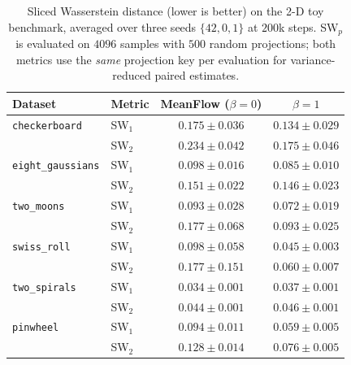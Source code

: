 \begin{table}[!t]
    \centering
    \caption{Sliced Wasserstein distance (lower is better) on the 2-D toy benchmark, averaged over three seeds $\{42,0,1\}$ at $200$k steps. SW$_p$ is evaluated on $4096$ samples with $500$ random projections; both metrics use the \emph{same} projection key per evaluation for variance-reduced paired estimates.}
    \label{tab: toy}
    \begin{tabular}{llcc}
        \toprule
        Dataset & Metric & MeanFlow ($\beta\!=\!0$) & $\beta\!=\!1$ \\
        \midrule
        \texttt{checkerboard}    & SW$_1$ & $0.175 \pm 0.036$ & $\mathbf{0.134 \pm 0.029}$ \\
                                 & SW$_2$ & $0.234 \pm 0.042$ & $\mathbf{0.175 \pm 0.046}$ \\
        \midrule
        \texttt{eight\_gaussians}& SW$_1$ & $0.098 \pm 0.016$ & $\mathbf{0.085 \pm 0.010}$ \\
                                 & SW$_2$ & $0.151 \pm 0.022$ & $\mathbf{0.146 \pm 0.023}$ \\
        \midrule
        \texttt{two\_moons}      & SW$_1$ & $0.093 \pm 0.028$ & $\mathbf{0.072 \pm 0.019}$ \\
                                 & SW$_2$ & $0.177 \pm 0.068$ & $\mathbf{0.093 \pm 0.025}$ \\
        \midrule
        \texttt{swiss\_roll}     & SW$_1$ & $0.098 \pm 0.058$ & $\mathbf{0.045 \pm 0.003}$ \\
                                 & SW$_2$ & $0.177 \pm 0.151$ & $\mathbf{0.060 \pm 0.007}$ \\
        \midrule
        \texttt{two\_spirals}    & SW$_1$ & $\mathbf{0.034 \pm 0.001}$ & $0.037 \pm 0.001$ \\
                                 & SW$_2$ & $\mathbf{0.044 \pm 0.001}$ & $0.046 \pm 0.001$ \\
        \midrule
        \texttt{pinwheel}        & SW$_1$ & $0.094 \pm 0.011$ & $\mathbf{0.059 \pm 0.005}$ \\
                                 & SW$_2$ & $0.128 \pm 0.014$ & $\mathbf{0.076 \pm 0.005}$ \\
        \bottomrule
    \end{tabular}
\end{table}
